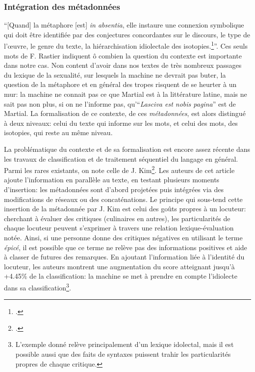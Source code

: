 
\subsubsection{Intégration des métadonnées}

\enquote{[Quand] la métaphore [est] \textit{in absentia}, elle instaure une connexion symbolique qui doit être identifiée par des conjectures concordantes sur le discours, le type de l'œuvre, le genre du texte, la hiérarchisation idiolectale des isotopies.\footcite[p. 98]{rastier_tropes_1994}}. Ces seuls mots de F. Rastier indiquent ô combien la question du contexte est importante dans notre cas. Non content d'avoir dans nos textes de très nombreux passages du lexique de la sexualité, sur lesquels la machine ne devrait pas buter, la question de la métaphore et en général des tropes risquent de se heurter à un mur: la machine ne connait pas ce que Martial est à la littérature latine, mais ne sait pas non plus, si on ne l'informe pas, qu'\enquote{\textit{Lasciva est nobis pagina}} est de Martial. La formalisation de ce contexte, de ces \textit{métadonnées}, est alors distingué à deux niveaux: celui du texte qui informe sur les mots, et celui des mots, des isotopies, qui reste au même niveau.

La problématique du contexte et de sa formalisation est encore assez récente dans les travaux de classification et de traitement séquentiel du langage en général. Parmi les rares existants, on note celle de J. Kim\footcite{kim_categorical_2019}. Les auteurs de cet article ajoute l'information en parallèle au texte, en testant plusieurs moments d'insertion: les métadonnées sont d'abord projetées puis intégrées via des modifications de réseaux ou des concaténations. Le principe qui sous-tend cette insertion de la métadonnée par J. Kim est celui des goûts propres à un locuteur: cherchant à évaluer des critiques (culinaires en autres), les particularités de chaque locuteur peuvent s'exprimer à travers une relation lexique-évaluation notée. Ainsi, si une personne donne des critiques négatives en utilisant le terme \textit{épicé}, il est possible que ce terme ne relève pas des informations positives et aide à classer de futures des remarques. En ajoutant l'information liée à l'identité du locuteur, les auteurs montrent une augmentation du score atteignant jusqu'à +4.45\% de la classification: la machine se met à prendre en compte l'idiolecte dans sa classification\footnote{L'exemple donné relève principalement d'un lexique idolectal, mais il est possible aussi que des faits de syntaxes puissent trahir les particularités propres de chaque critique.}.

